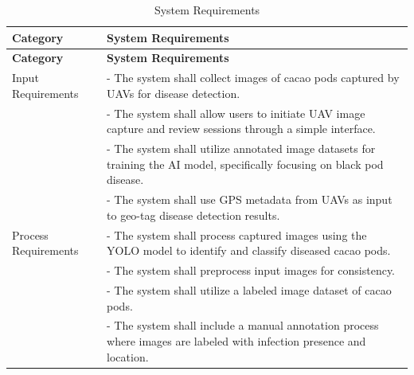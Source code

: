\begin{longtable}{p{4cm} p{8cm}}
	\caption{System Requirements} \label{tab:sysreq}                                                                                                                                      \\

	\toprule
	\textbf{Category}        & \textbf{System Requirements}                                                                                                                               \\
	\midrule
	\endfirsthead

	\toprule
	\textbf{Category}        & \textbf{System Requirements}                                                                                                                               \\
	\midrule
	\endhead

	\bottomrule
	\endfoot

	Input Requirements       & - The system shall collect images of cacao pods captured by UAVs for disease detection.                                                                    \\
	                         & - The system shall allow users to initiate UAV image capture and review sessions through a simple interface.                                               \\
	                         & - The system shall utilize annotated image datasets for training the AI model, specifically focusing on black pod disease.                                 \\
	                         & - The system shall use GPS metadata from UAVs as input to geo-tag disease detection results.                                                               \\
	\midrule

	Process Requirements     & - The system shall process captured images using the YOLO model to identify and classify diseased cacao pods.                                              \\
	                         & - The system shall preprocess input images for consistency.                                                                                                \\
	                         & - The system shall utilize a labeled image dataset of cacao pods.                                                                                          \\
	                         & - The system shall include a manual annotation process where images are labeled with infection presence and location.                                      \\
	\midrule


\end{longtable}
